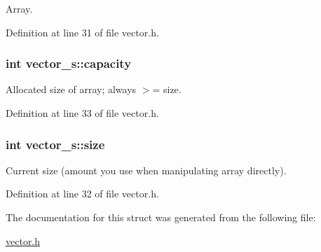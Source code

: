 Array. 



Definition at line 31 of file vector.h.

\hypertarget{structvector__s_a8db5892656cbc148d5bf3b8fcb144df9}{
\subsubsection[{capacity}]{\setlength{\rightskip}{0pt plus 5cm}int {\bf vector\_\-s::capacity}}}
\label{structvector__s_a8db5892656cbc148d5bf3b8fcb144df9}


Allocated size of array; always $>$= size. 



Definition at line 33 of file vector.h.

\hypertarget{structvector__s_a817205845ca0191af990f05b62e587b9}{
\subsubsection[{size}]{\setlength{\rightskip}{0pt plus 5cm}int {\bf vector\_\-s::size}}}
\label{structvector__s_a817205845ca0191af990f05b62e587b9}


Current size (amount you use when manipulating array directly). 



Definition at line 32 of file vector.h.



The documentation for this struct was generated from the following file:\begin{DoxyCompactItemize}
\item 
\hyperlink{vector_8h}{vector.h}\end{DoxyCompactItemize}
